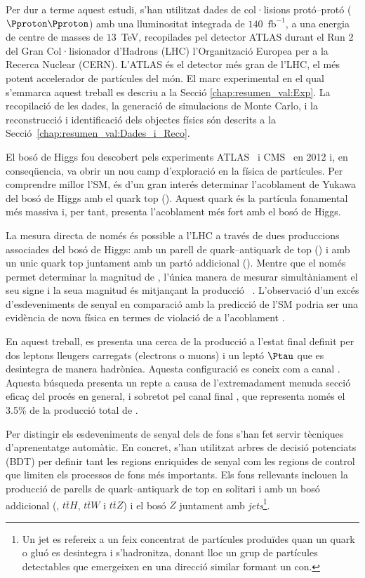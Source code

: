 Per dur a terme aquest estudi, s'han utilitzat dades de col·lisions protó--protó ($\Pproton \Pproton$) amb una 
lluminositat integrada de $140$~$\text{fb}^{-1}$, a una energia de centre de masses de 
$13$~TeV, recopilades pel detector ATLAS durant el Run 2 del Gran Col·lisionador 
d'Hadrons (LHC) l'Organització Europea per a la Recerca Nuclear (CERN). L'ATLAS 
és el detector més gran de l'LHC, el més potent accelerador de partícules del 
món. El marc experimental en el qual s'emmarca aquest treball es descriu a la Secció 
\ref{chap:resumen_val:Exp}. La recopilació de les dades, la generació de simulacions 
de Monte Carlo, i la reconstrucció i identificació dels objectes físics són descrits a
la Secció~\ref{chap:resumen_val:Dades_i_Reco}.

El bosó de Higgs fou descobert pels experiments ATLAS~\cite{20121_ATLAS_HiggsDiscovery} 
i CMS~\cite{201230_CMS_HiggsDiscovery} en 2012 i, en conseqüencia, va obrir un nou camp d'exploració en la física 
de partícules. Per comprendre millor l'SM, és d'un gran interés determinar l'acoblament de Yukawa 
del bosó de Higgs amb el quark $\text{top}$ (\yt). Aquest quark és la partícula fonamental més massiva 
i, per tant, presenta l'acoblament més fort amb el bosó de Higgs.

La mesura directa de \yt només és possible a l'LHC a través de dues produccions associades 
del bosó de Higgs: amb un parell de quark--antiquark de $\text{top}$ (\ttH) i amb un unic quark $\text{top}$ 
juntament amb un partó addicional (\tHq). Mentre que el \ttH només permet determinar la 
magnitud de \yt, l'única manera de mesurar simultàniament el seu signe i la seua magnitud és mitjançant la
 producció \tH~\cite{Demartin:2015uha}. L'observació d'un excés d'esdeveniments de senyal en 
 comparació amb la predicció de l'SM podria ser una evidència de nova física en termes de violació 
 de \CP a l'acoblament \yt.
 
 En aquest treball, es presenta una cerca de la producció \tHq a l'estat final definit 
per dos leptons lleugers carregats (electrons o muons) i un leptó $\Ptau$ que es desintegra 
de manera hadrònica. Aquesta configuració es coneix com a canal \dileptau.
Aquesta búsqueda presenta un repte a causa de l'extremadament menuda secció eficaç del procés \tHq en general,
i sobretot pel canal final \dileptau, que representa només el 3.5\% de la producció total de \tHq.

Per distingir els esdeveniments de senyal \tHq dels de fons s'han fet servir tècniques d'aprenentatge automàtic. 
En concret, s'han utilitzat arbres de decisió potenciats (BDT) per definir tant les regions enriquides de senyal com les regions 
de control que limiten els processos de fons més importants. Els fons rellevants inclouen la producció de parells 
de quark--antiquark de $\text{top}$ en solitari i amb un bosó addicional (\ttbar, $t\bar{t}H$, $t\bar{t}W$ i $t\bar{t}Z$) i 
el bosó $Z$ juntament amb \textit{jets}\footnote{Un jet es refereix a un feix concentrat de partícules produïdes 
quan un quark o gluó es desintegra i s'hadronitza, donant lloc un grup de partícules detectables que emergeixen
en una direcció similar formant un con.}.


